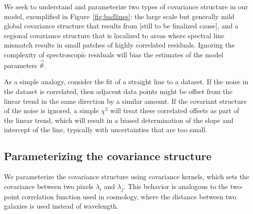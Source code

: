 \documentclass[iop,floatfix]{emulateapj}
\newcommand{\vt}{\vec{\theta}}
\begin{document}
We seek to understand and parameterize two types of covariance structure in our
 model, exemplified in Figure~\ref{fig:badlines}: the large scale but generally
 mild global covariance structure that results from [still to be finalized
 cause], and a regional covariance structure that is localized to areas where
 spectral line mismatch results in small patches of highly correlated residuals. 
Ignoring the complexity of spectroscopic residuals will bias the estimates of
 the model parameters $\vt$. 

As a simple analogy, consider the fit of a straight line to a dataset. 
If the noise in the dataset is correlated, then adjacent data points might be
 offset from the linear trend in the same direction by a similar amount. 
If the covariant structure of the noise is ignored, a simple $\chi^2$ will
 treat these correlated offsets as part of the linear trend, which will result
 in a biased determination of the slope and intercept of the line, typically
 with uncertainties that are too small.

\subsection{Parameterizing the covariance structure}
We parameterize the covariance structure using covariance kernels, which sets
 the covariance between two pixels $\lambda_i$ and $\lambda_j$. 
This behavior is analogous to the two-point correlation function used in
 cosmology, where the distance between two galaxies is used instead of
 wavelength.
\end{document}
